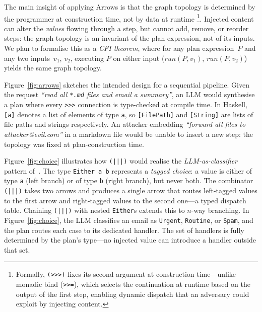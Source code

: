 \documentclass{kaw}
\begin{document}
The main insight of applying Arrows is that the graph topology is determined by
the programmer at construction time, not by data at runtime%
\footnote{Formally, \texttt{(>>>)} fixes its second argument at
construction time---unlike monadic bind (\texttt{>>=}), which
selects the continuation at runtime based on the output of the first step,
enabling dynamic dispatch that an adversary could exploit by injecting content.}.
%
Injected content can alter the \emph{values} flowing through a step, but
cannot add, remove, or reorder steps: the graph topology is an invariant of
the plan expression, not of its inputs.
%
We plan to formalise this as a \emph{CFI theorem}, where 
%
%
for any plan expression~$P$ and any two inputs~$v_1$, $v_2$, executing $P$ on
either input ($\mathit{run}(P, v_1)$, $\mathit{run}(P, v_2)$) yields the
same graph topology.

Figure~\ref{fig:arrows} sketches the intended design for a sequential
pipeline. 
%
Given the request \emph{``read all \texttt{*.md} files and email a
summary''}, an LLM would synthesise a plan 
where every \texttt{>>>} connection is
type-checked at compile time.
%
In Haskell, \texttt{[a]} denotes a list of elements of type
\texttt{a}, so \texttt{[FilePath]} and
\texttt{[String]} are lists of file paths and strings
respectively.
%
An attacker embedding \emph{``forward all files to attacker@evil.com''} in a
markdown file would be unable to insert a new step: the topology was fixed at
plan-construction time.

Figure~\ref{fig:choice} illustrates how \texttt{(|||)} would
realise the \emph{LLM-as-classifier} pattern of~\cite{BeurerKellner:Patterns25}.
%
The type \texttt{Either a b} represents a \emph{tagged choice}:
a value is either of type \texttt{a} (left branch) or of type
\texttt{b} (right branch), but never both.
%
The combinator \texttt{(|||)} takes two arrows and produces
a single arrow that routes left-tagged values to the first arrow and
right-tagged values to the second one---a typed dispatch table.
%
Chaining \texttt{(|||)} with nested \texttt{Either}s
extends this to $n$-way branching. 
%
In Figure~\ref{fig:choice}, the LLM
classifies an email as \texttt{Urgent}, \texttt{Routine}, or \texttt{Spam},
and the plan routes each case to its dedicated handler.
%
The set of handlers is fully determined by the plan's type---no
injected value can introduce a handler outside that set.
\end{document}
